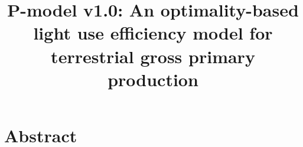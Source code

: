\documentclass{myreport}
\begin{document}
\pagestyle{headings}

% 


\title{P-model v1.0: An optimality-based light use efficiency model for terrestrial gross primary production}

\maketitle

\tableofcontents

\section*{Abstract}
\end{document}
